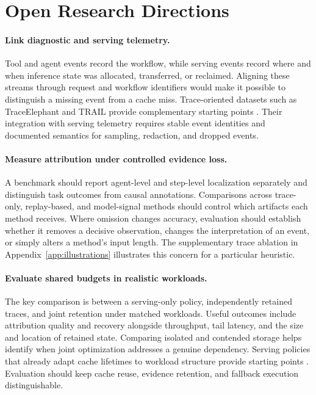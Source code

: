 \documentclass[preprint,12pt]{elsarticle}
\begin{document}
\section{Open Research Directions}\label{sec:agenda}
\paragraph{Link diagnostic and serving telemetry.}
Tool and agent events record the workflow, while serving events record where and when inference state was allocated, transferred, or reclaimed. Aligning these streams through request and workflow identifiers would make it possible to distinguish a missing event from a cache miss. Trace-oriented datasets such as TraceElephant and TRAIL provide complementary starting points \cite{v5ref6,v5ref10}. Their integration with serving telemetry requires stable event identities and documented semantics for sampling, redaction, and dropped events.

\paragraph{Measure attribution under controlled evidence loss.}
A benchmark should report agent-level and step-level localization separately and distinguish task outcomes from causal annotations. Comparisons across trace-only, replay-based, and model-signal methods should control which artifacts each method receives. Where omission changes accuracy, evaluation should establish whether it removes a decisive observation, changes the interpretation of an event, or simply alters a method's input length. The supplementary trace ablation in Appendix~\ref{app:illustrations} illustrates this concern for a particular heuristic.

\paragraph{Evaluate shared budgets in realistic workloads.}
The key comparison is between a serving-only policy, independently retained traces, and joint retention under matched workloads. Useful outcomes include attribution quality and recovery alongside throughput, tail latency, and the size and location of retained state. Comparing isolated and contended storage helps identify when joint optimization addresses a genuine dependency. Serving policies that already adapt cache lifetimes to workload structure provide starting points \cite{v5ref16,v5ref47}. Evaluation should keep cache reuse, evidence retention, and fallback execution distinguishable.
\end{document}

